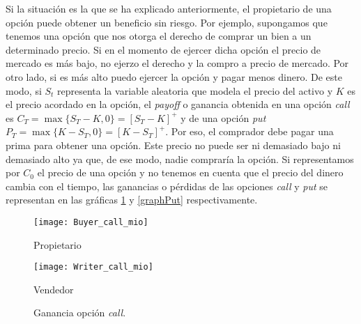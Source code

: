 Si la situación es la que se ha explicado anteriormente, el propietario de una opción puede obtener un beneficio sin riesgo. Por ejemplo, supongamos que tenemos una opción que nos otorga el derecho de comprar un bien a un determinado precio. Si en el momento de ejercer dicha opción el precio de mercado es más bajo, no ejerzo el derecho y la compro a precio de mercado. Por otro lado, si es más alto puedo ejercer la opción y pagar menos dinero. De este modo, si $ S_t $ representa la variable aleatoria que modela el precio del activo y $ K $ es el precio acordado en la opción, el \textit{payoff} o ganancia obtenida en una opción \textit{call} es $ C_T = \max\{S_T-K, 0\} = \left[S_T - K\right]^+ $ y de una opción \textit{put} $ P_T = \max\{K-S_T, 0\} = \left[K-S_T\right]^+ $. Por eso, el comprador debe pagar una prima para obtener una opción. Este precio no puede ser ni demasiado bajo ni demasiado alto ya que, de ese modo, nadie compraría la opción. Si representamos por $ C_0 $ el precio de una opción y no tenemos en cuenta que el precio del dinero cambia con el tiempo, las ganancias o pérdidas de las opciones \textit{call} y \textit{put} se representan en las gráficas \ref{graphCall} y \ref{graphPut} respectivamente.  \\

\begin{figure}[h!]
	\begin{minipage}{0.5\textwidth}
		\centering
		\texttt{[image: Buyer\_call\_mio]} 
		\caption*{Propietario}
	\end{minipage}
	\begin{minipage}{0.5\textwidth}
		\texttt{[image: Writer\_call\_mio]}
		\caption*{Vendedor}
		
	\end{minipage}
	\caption{Ganancia opción \textit{call}.}
	\label{graphCall}
\end{figure}

